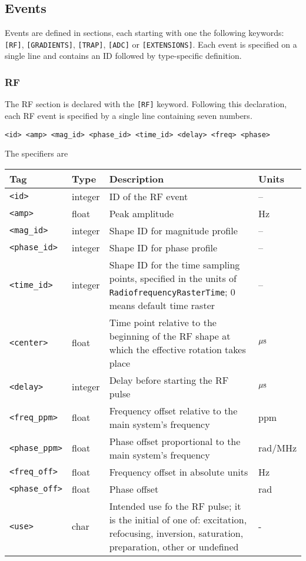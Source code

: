 \documentclass{article}
\begin{document}
\subsection{Events}

Events are defined in sections, each starting with one the following keywords: \verb.[RF]., \verb.[GRADIENTS]., \verb.[TRAP]., \verb.[ADC]. or \verb.[EXTENSIONS].. Each event is specified on a single line and contains an ID followed by type-specific definition.

\subsubsection{RF}
The RF section is declared with the \verb.[RF]. keyword. Following this declaration, each RF event is specified by a single line containing seven numbers.
\begin{lstlisting}
<id> <amp> <mag_id> <phase_id> <time_id> <delay> <freq> <phase>
\end{lstlisting}

The specifiers are

\begin{tabularx}{\textwidth}{llXl}
\toprule
Tag & Type & Description & Units\\
\midrule
\verb.<id>. & integer & ID of the RF event & -- \\
\verb.<amp>. & float & Peak amplitude & Hz \\
\verb.<mag_id>. & integer & Shape ID for magnitude profile & -- \\
\verb.<phase_id>. & integer & Shape ID for phase profile & --\\
\verb.<time_id>. & integer & Shape ID for the time sampling points, specified in the units of \verb.RadiofrequencyRasterTime.; 0 means default time raster & -- \\
\verb.<center>. & float & Time point relative to the beginning of the RF shape at which the effective rotation takes place & $\rm \mu s$\\
\verb.<delay>. & integer & Delay before starting the RF pulse & $\rm \mu s$\\
\verb.<freq_ppm>. & float & Frequency offset relative to the main system's frequency & ppm \\
\verb.<phase_ppm>. & float & Phase offset proportional to the main system's frequency & rad/MHz \\
\verb.<freq_off>. & float & Frequency offset in absolute units & Hz \\
\verb.<phase_off>. & float & Phase offset & rad \\
\verb.<use>. & char & Intended use fo the RF pulse; it is the initial of one of: 
excitation, refocusing, inversion, saturation,  preparation, other or undefined & - \\
\bottomrule
\end{tabularx}
\end{document}
